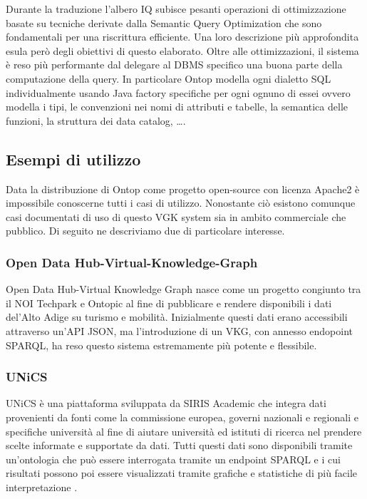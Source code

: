 Durante la traduzione l'albero IQ subisce pesanti operazioni di ottimizzazione basate su tecniche derivate dalla Semantic Query Optimization che sono fondamentali per una riscrittura efficiente. Una loro descrizione più approfondita esula però degli obiettivi di questo elaborato.
Oltre alle ottimizzazioni, il sistema è reso più performante dal delegare al DBMS specifico una buona parte della computazione della query. In particolare Ontop modella ogni dialetto SQL individualmente usando Java factory specifiche per ogni ognuno di essei ovvero 
modella i tipi, le convenzioni nei nomi di attributi e tabelle, la semantica delle funzioni, la struttura dei data catalog, \dots. 

\subsection{Esempi di utilizzo}
Data la distribuzione di Ontop come progetto open-source con licenza Apache2 è impossibile conoscerne tutti i casi di utilizzo. Nonostante ciò esistono comunque casi documentati di uso di questo VGK system sia in ambito commerciale che pubblico. Di seguito ne descriviamo due di particolare interesse. \cite{Ontop}
\subsubsection*{Open Data Hub-Virtual-Knowledge-Graph}
Open Data Hub-Virtual Knowledge Graph nasce come un progetto congiunto tra il NOI Techpark e Ontopic al fine di pubblicare e rendere disponibili i dati del'Alto Adige su turismo e mobilità. Inizialmente questi dati erano accessibili attraverso un'API JSON, ma l'introduzione di un VKG, con annesso endopoint SPARQL, ha
reso questo sistema estremamente più potente e flessibile.
\subsubsection*{UNiCS}
UNiCS è una piattaforma sviluppata da SIRIS Academic che integra dati provenienti da fonti come la commissione europea, governi nazionali e regionali e specifiche università al fine di aiutare università ed istituti di ricerca nel prendere scelte informate e supportate da dati. Tutti questi dati sono disponibili 
tramite un'ontologia che può essere interrogata tramite un endpoint SPARQL e i cui risultati possono poi essere visualizzati tramite grafiche e statistiche di più facile interpretazione \cite{UniCS}.

